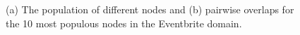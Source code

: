 \ifpaper
\begin{figure}[h]
	\centering
	\vspace{-10pt}
	\hspace{-10pt}
	\vspace{-10pt}
	\caption{(a) The population of different nodes and (b) pairwise overlaps for the 10 most populous nodes in the Eventbrite domain.}
	\vspace{-10pt}
\end{figure}
\fi

